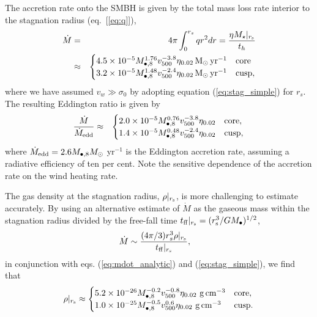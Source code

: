 \documentclass[usenatbib,fleqn]{mn2e}
\newcommand{\rs}{r_s}
\newcommand{\Mbheight}{M_{\bullet,8}}
\newcommand{\pyear}{{\rm yr}^{-1}}
\renewcommand{\th}{t_h}
\newcommand{\tff}{t_{\rm ff}}
\begin{document}
The accretion rate onto the SMBH is given by the total mass loss rate interior to the stagnation radius (eq.~[\ref{eq:q}]), 
\begin{eqnarray}
  \dot{M} &=& 4\pi \int_{0}^{r_{s}}q r^{2}dr = \frac{\eta M_{\star}|_{r_{\rm s}}}{\th} \nonumber \\
&\approx&
  \begin{cases}
    4.5 \times 10^{-5} M_{\bullet,8}^{1.76}
    v_{500}^{-3.8}  \eta_{0.02} \Msun \, \pyear& \text{core} \\
    3.2 \times 10^{-5} M_{\bullet,8}^{1.48} 
    v_{500}^{-2.4}  \eta_{0.02} \Msun \, \pyear  & \text{cusp}, 
  \end{cases}
  \label{eq:mdot_analytic}
\end{eqnarray}
where we have assumed $v_{w} \gg \sigma_0$ by adopting equation
(\ref{eq:stag_simple}) for $r_s$.  The resulting Eddington ratio is
given by
\begin{eqnarray}
\frac{\dot{M}}{\dot{M}_{\rm edd}} &\approx&
  \begin{cases}
    2.0 \times 10^{-5} M_{\bullet,8}^{0.76}
    v_{500}^{-3.8}  \eta_{0.02}   & \text{core}, \\
    1.4 \times 10^{-5} \Mbheight^{0.48} 
    v_{500}^{-2.4}  \eta_{0.02}   & \text{cusp}, 
  \end{cases}
  \label{eq:eddr_analytic}
\end{eqnarray}
where $\dot{M}_{\rm edd} = 2.6M_{\bullet,8}M_{\odot}$ yr$^{-1}$ is the
Eddington accretion rate, assuming a radiative efficiency of ten per
cent.  Note the sensitive dependence of the accretion rate on the wind
heating rate.

The gas density at the stagnation radius, $\rho|_{r_{\rm s}}$, is more
challenging to estimate accurately.  By using an alternative estimate of
$\dot{M}$ as the gaseous mass within the stagnation radius divided by
the free-fall time $t_{\rm ff}|_{r_{\rm s}} = (r_{\rm
  s}^{3}/GM_{\bullet})^{1/2}$,
\begin{align}
  &\dot{M}\sim\frac{(4 \pi/3) \rs^3 \rho|_{r_{\rm s}}}{\tff|_{r_{\rm s}}},
  \label{eq:mdot_gas}
\end{align}
 in conjunction with eqs. (\ref{eq:mdot_analytic}) and (\ref{eq:stag_simple}), we find that
\begin{align}
  \rho|_{r_{\rm s}}\approx
  \begin{cases}
    5.2 \times 10^{-26} \Mbheight^{-0.2} v_{500}^{-0.8}  \eta_{0.02} \,
    \, {\rm g \, cm^{-3}}& \text{core},\\
    1.0 \times 10^{-25}  \Mbheight^{-0.5} v_{500}^{0.6}  \eta_{0.02} \,\, {\rm g \,cm^{-3}} & \text{cusp}.
  \end{cases}
  \label{eq:rhors}
\end{align}
\end{document}
